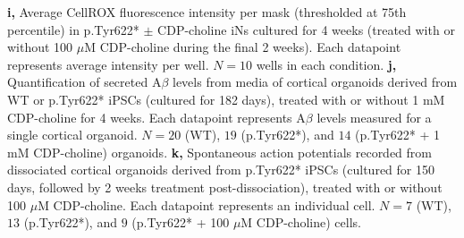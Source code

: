 \textbf{i,} Average CellROX fluorescence intensity per mask (thresholded at 75th percentile) in p.Tyr622* $\pm$ CDP-choline iNs cultured for 4 weeks (treated with or without 100 $\mu$M CDP-choline during the final 2 weeks). Each datapoint represents average intensity per well. $N=10$ wells in each condition.
\textbf{j,} Quantification of secreted A$\beta$ levels from media of cortical organoids derived from WT or p.Tyr622* iPSCs (cultured for 182 days), treated with or without 1 mM CDP-choline for 4 weeks. Each datapoint represents A$\beta$ levels measured for a single cortical organoid. $N=20$ (WT), $19$ (p.Tyr622*), and $14$ (p.Tyr622* + 1 mM CDP-choline) organoids.
\textbf{k,} Spontaneous action potentials recorded from dissociated cortical organoids derived from p.Tyr622* iPSCs (cultured for 150 days, followed by 2 weeks treatment post-dissociation), treated with or without 100 $\mu$M CDP-choline. Each datapoint represents an individual cell. $N=7$ (WT), $13$ (p.Tyr622*), and $9$ (p.Tyr622* + 100 $\mu$M CDP-choline) cells.
